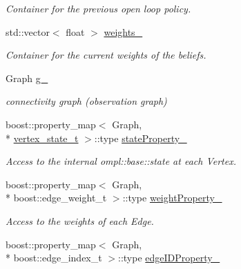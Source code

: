 \begin{DoxyCompactItemize}
\begin{DoxyCompactList}\small\item\em Container for the previous open loop policy. \end{DoxyCompactList}\item 
\hypertarget{class_n_b_m3_p_a9bbb021ca2cb7147bbd86b424b5916bb}{std\-::vector$<$ float $>$ \hyperlink{class_n_b_m3_p_a9bbb021ca2cb7147bbd86b424b5916bb}{weights\-\_\-}}\label{class_n_b_m3_p_a9bbb021ca2cb7147bbd86b424b5916bb}

\begin{DoxyCompactList}\small\item\em Container for the current weights of the beliefs. \end{DoxyCompactList}\item 
\hypertarget{class_n_b_m3_p_a35d09fe5f1740d998ae63bfe60239ce8}{Graph \hyperlink{class_n_b_m3_p_a35d09fe5f1740d998ae63bfe60239ce8}{g\-\_\-}}\label{class_n_b_m3_p_a35d09fe5f1740d998ae63bfe60239ce8}

\begin{DoxyCompactList}\small\item\em connectivity graph (observation graph) \end{DoxyCompactList}\item 
\hypertarget{class_n_b_m3_p_a7069dd6ab7e1f4f82b1eea703145b552}{boost\-::property\-\_\-map$<$ Graph, \\*
\hyperlink{struct_n_b_m3_p_1_1vertex__state__t}{vertex\-\_\-state\-\_\-t} $>$\-::type \hyperlink{class_n_b_m3_p_a7069dd6ab7e1f4f82b1eea703145b552}{state\-Property\-\_\-}}\label{class_n_b_m3_p_a7069dd6ab7e1f4f82b1eea703145b552}

\begin{DoxyCompactList}\small\item\em Access to the internal ompl\-::base\-::state at each Vertex. \end{DoxyCompactList}\item 
\hypertarget{class_n_b_m3_p_a1710534b402342904c1dc5b0cb311a64}{boost\-::property\-\_\-map$<$ Graph, \\*
boost\-::edge\-\_\-weight\-\_\-t $>$\-::type \hyperlink{class_n_b_m3_p_a1710534b402342904c1dc5b0cb311a64}{weight\-Property\-\_\-}}\label{class_n_b_m3_p_a1710534b402342904c1dc5b0cb311a64}

\begin{DoxyCompactList}\small\item\em Access to the weights of each Edge. \end{DoxyCompactList}\item 
\hypertarget{class_n_b_m3_p_acbab5abc9163ec04ce900b607e9fee89}{boost\-::property\-\_\-map$<$ Graph, \\*
boost\-::edge\-\_\-index\-\_\-t $>$\-::type \hyperlink{class_n_b_m3_p_acbab5abc9163ec04ce900b607e9fee89}{edge\-I\-D\-Property\-\_\-}}\label{class_n_b_m3_p_acbab5abc9163ec04ce900b607e9fee89}


\end{DoxyCompactItemize}
